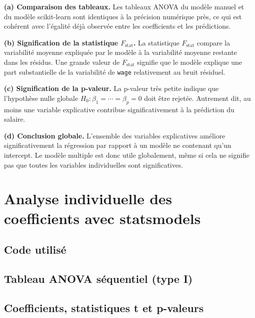 \documentclass[12pt,letterpaper]{article}
\begin{document}
\textbf{(a) Comparaison des tableaux.}
Les tableaux ANOVA du modèle manuel et du modèle scikit-learn sont identiques à la précision numérique près, ce qui est cohérent avec l'égalité déjà observée entre les coefficients et les prédictions.

\textbf{(b) Signification de la statistique $F_{\text{stat}}$.}
La statistique $F_{\text{stat}}$ compare la variabilité moyenne expliquée par le modèle à la variabilité moyenne restante dans les résidus.
Une grande valeur de $F_{\text{stat}}$ signifie que le modèle explique une part substantielle de la variabilité de \texttt{wage} relativement au bruit résiduel.

\textbf{(c) Signification de la p-valeur.}
La p-valeur très petite indique que l'hypothèse nulle globale $H_0 : \beta_1=\cdots=\beta_p=0$ doit être rejetée.
Autrement dit, au moins une variable explicative contribue significativement à la prédiction du salaire.

\textbf{(d) Conclusion globale.}
L'ensemble des variables explicatives améliore significativement la régression par rapport à un modèle ne contenant qu'un intercept.
Le modèle multiple est donc utile globalement, même si cela ne signifie pas que toutes les variables individuelles sont significatives.

\section{Analyse individuelle des coefficients avec statsmodels}

\subsection{Code utilisé}



\subsection{Tableau ANOVA séquentiel (type I)}



\subsection{Coefficients, statistiques t et p-valeurs}


\end{document}
